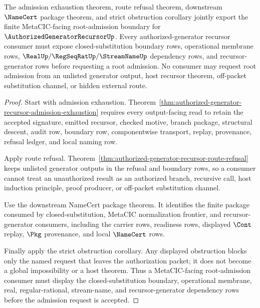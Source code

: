 \begin{theorem}
\label{thm:authorized-generator-recursor-root-admission-public-export}
The admission exhaustion theorem, route refusal theorem, downstream $\NameCert$ package theorem, and strict obstruction corollary jointly export the finite MetaCIC-facing root-admission boundary for $\AuthorizedGeneratorRecursorUp$. Every authorized-generator recursor consumer must expose closed-substitution boundary rows, operational membrane rows, $\RealUp/\RegSeqRatUp/\StreamNameUp$ dependency rows, and recursor-generator rows before requesting a root admission. No consumer may request root admission from an unlisted generator output, host recursor theorem, off-packet substitution channel, or hidden external route.
\end{theorem}
\begin{proof}
Start with admission exhaustion. Theorem~\ref{thm:authorized-generator-recursor-admission-exhaustion} requires every output-facing read to retain the accepted signature, emitted recursor, checked motive, branch package, structural descent, audit row, boundary row, componentwise transport, replay, provenance, refusal ledger, and local naming row.

Apply route refusal. Theorem~\ref{thm:authorized-generator-recursor-route-refusal} keeps unlisted generator outputs in the refusal and boundary rows, so a consumer cannot treat an unauthorized result as an authorized branch, recursive call, host induction principle, proof producer, or off-packet substitution channel.

Use the downstream NameCert package theorem. It identifies the finite package consumed by closed-substitution, MetaCIC normalization frontier, and recursor-generator consumers, including the carrier rows, readiness rows, displayed $\Cont$ replay, $\Pkg$ provenance, and local $\NameCert$ rows.

Finally apply the strict obstruction corollary. Any displayed obstruction blocks only the named request that leaves the authorization packet; it does not become a global impossibility or a host theorem. Thus a MetaCIC-facing root-admission consumer must display the closed-substitution boundary, operational membrane, real, regular-rational, stream-name, and recursor-generator dependency rows before the admission request is accepted.
\end{proof}
